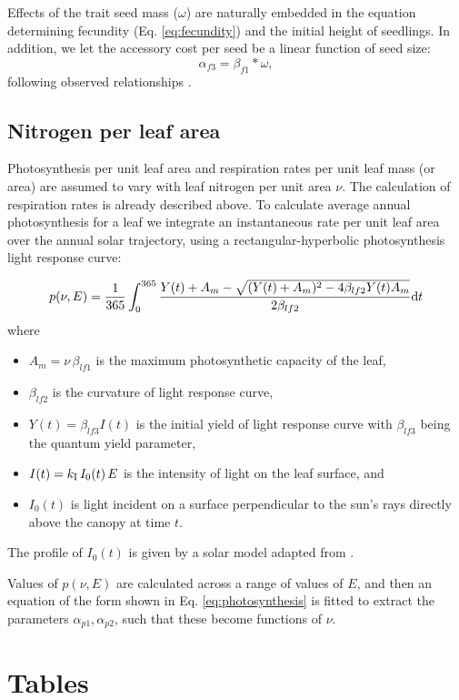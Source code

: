 \documentclass[10pt,twoside]{article}
\begin{document}
Effects of the trait seed mass ($\omega$) are naturally embedded in the equation determining
fecundity (Eq. \ref{eq:fecundity}) and the initial height of seedlings. In addition,
we let the accessory cost per seed be a linear function of seed size:
$$\alpha_{f3} = \beta_{f1} * \omega,$$
following observed relationships \citep{Henery-2001}.

\subsection{Nitrogen per leaf area}

Photosynthesis per unit leaf area and respiration rates per unit leaf mass (or area)
are assumed to vary with leaf nitrogen per unit area $\nu$. The calculation of respiration rates is already described above. To calculate average annual photosynthesis for a leaf
we integrate an instantaneous rate per unit leaf area over the annual solar trajectory,
using a rectangular-hyperbolic photosynthesis light response curve:

$$p(\nu, E) = \frac1{365}\int_0^{365 }\frac{Y(t) + A_m - \sqrt{(Y(t) + A_m)^2 - 4  \beta_{lf2} Y(t) A_m }}{2 \beta_{lf2}} {\rm d}t$$
where
\begin{itemize}
  \item $A_m = \nu \, \beta_{lf1}$ is the maximum photosynthetic capacity of the leaf,
  \item $\beta_{lf2}$ is the curvature of light response curve,
  \item $Y(t) = \beta_{lf3} I(t)$ is the initial yield of light response curve with $\beta_{lf3}$ being the quantum yield parameter,
  \item $I(t) = k_{\rm I} \, I_0(t)\, E$ is the intensity of light on the leaf surface, and
  \item $I_0(t)$ is light incident on a surface perpendicular to the sun's rays directly above the canopy at time $t$.
\end{itemize}
The profile of $I_0(t)$ is given by a solar model adapted from \citet{TerSteege-1997}.

Values of $p(\nu, E)$ are calculated across a range of values of $E$, and then an equation of the form shown in Eq. \ref{eq:photosynthesis} is fitted to extract the parameters
$\alpha_{p1}, \alpha_{p2}$, such that these become functions of $\nu$.

\clearpage

\section{Tables}\label{tables}
\end{document}
